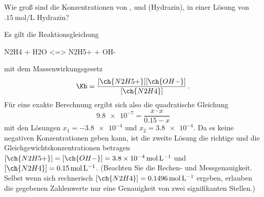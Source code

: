 \documentclass{arbeitsblatt}
\begin{document}
\begin{question}
  Wie groß sind die Konzentrationen von ,  und 
  (Hydrazin), in einer Lösung von $\SI{.15}{\mole\per\liter}$ Hydrazin?
\end{question}
\begin{solution}
  Es gilt die Reaktionsgleichung
  \begin{reaction*}
    N2H4 + H2O <=> N2H5+ + OH-
  \end{reaction*}
  mit dem Massenwirkungsgesetz
  \[
    \Kb = \frac{ [\ch{N2H5+}][\ch{OH-}] }{ [\ch{N2H4}] } \,.
  \]
  Für eine exakte Berechnung ergibt sich also die quadratische Gleichung
  \[
    \num{9.8e-7} = \frac{x\cdot x}{0.15 - x}
  \]
  mit den Lösungen $x_1 = \num{-3.8e-4}$ und $x_2 = \num{3.8e-4}$.  Da es
  keine negativen Konzentrationen geben kann, ist die zweite Lösung die
  richtige und die Gleichgewichtskonzentrationen betragen $[\ch{N2H5+}] =
  [\ch{OH-}] = \SI{3.8e-4}{\mole\per\liter}$ und $[\ch{N2H4}] =
  \SI{0.15}{\mole\per\liter}$.  (Beachten Sie die Rechen- und
  Messgenauigkeit.  Selbst wenn sich rechnerisch $[\ch{N2H4}] =
  \SI{0.1496}{\mole\per\liter}$ ergeben, erlauben die gegebenen Zahlenwerte
  nur eine Genauigkeit von zwei signifikanten Stellen.)
\end{solution}
\end{document}
